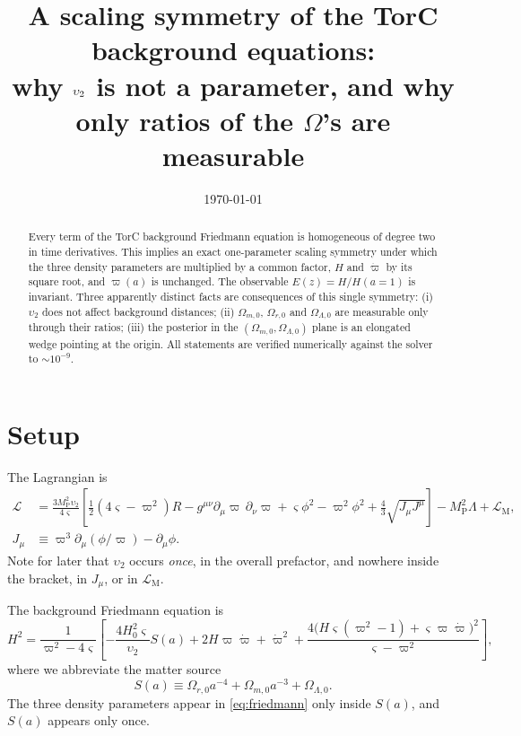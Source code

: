 \documentclass[11pt]{article}
\title{A scaling symmetry of the TorC background equations:\\
why $\ups$ is not a parameter, and why only ratios of the $\Omega$'s are measurable}
\author{}
\date{\today}
\newcommand{\Mp}{M_{\mathrm{P}}}
\newcommand{\Om}{\Omega_{m,0}}
\newcommand{\Or}{\Omega_{r,0}}
\newcommand{\OL}{\Omega_{\Lambda,0}}
\newcommand{\ups}{\upsilon_2}
\begin{document}
\maketitle

\begin{abstract}
Every term of the TorC background Friedmann equation is homogeneous of degree
two in time derivatives. This implies an exact one-parameter scaling symmetry
under which the three density parameters are multiplied by a common factor,
$H$ and $\dot\varpi$ by its square root, and $\varpi(a)$ is unchanged. The
observable $E(z)=H/H(a{=}1)$ is invariant. Three apparently distinct facts are
consequences of this single symmetry: (i) $\ups$ does not affect background
distances; (ii) $\Om$, $\Or$ and $\OL$ are measurable only through their
ratios; (iii) the posterior in the $(\Om,\OL)$ plane is an elongated wedge
pointing at the origin. All statements are verified numerically against the
solver to $\sim10^{-9}$.
\end{abstract}

\section{Setup}

The Lagrangian is
\begin{align}
\mathcal{L} &= \frac{3\Mp^2\ups}{4\varsigma}\left[\tfrac12(4\varsigma-\varpi^2)R
 - g^{\mu\nu}\partial_\mu\varpi\,\partial_\nu\varpi
 + \varsigma\phi^2 - \varpi^2\phi^2
 + \tfrac43\sqrt{J_\mu J^\mu}\right] - \Mp^2\Lambda + \mathcal{L}_{\mathrm M},
\label{eq:lagrangian}\\
J_\mu &\equiv \varpi^3\partial_\mu(\phi/\varpi) - \partial_\mu\phi .
\end{align}
Note for later that $\ups$ occurs \emph{once}, in the overall prefactor, and
nowhere inside the bracket, in $J_\mu$, or in $\mathcal{L}_{\mathrm M}$.

The background Friedmann equation is
\begin{equation}
H^2 = \frac{1}{\varpi^2-4\varsigma}\left[
 -\frac{4H_0^2\varsigma}{\ups}S(a)
 + 2H\varpi\dot\varpi
 + \dot\varpi^2
 + \frac{4\big(H\varsigma(\varpi^2-1) + \varsigma\varpi\dot\varpi\big)^2}
        {\varsigma-\varpi^2}\right],
\label{eq:friedmann}
\end{equation}
where we abbreviate the matter source
\begin{equation}
S(a) \equiv \Or a^{-4} + \Om a^{-3} + \OL .
\label{eq:source}
\end{equation}
The three density parameters appear in \eqref{eq:friedmann} only inside
$S(a)$, and $S(a)$ appears only once.
\end{document}
